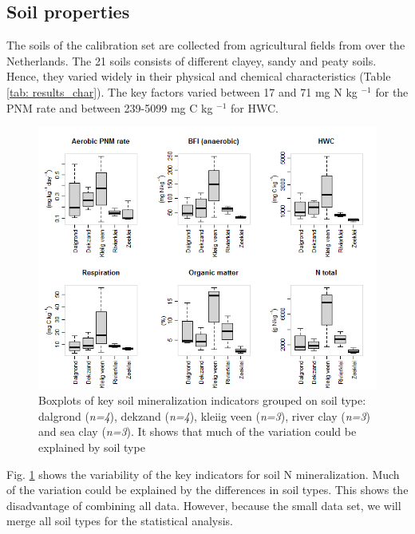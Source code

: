 \documentclass[10pt,twoside,dutch,english]{report}
\begin{document}
\subsection{Soil properties}
The soils of the calibration set are collected from agricultural fields from over the Netherlands. The 21 soils consists of different clayey, sandy and peaty soils. Hence, they varied widely in their physical and chemical characteristics (Table \ref{tab: results_char}). The key factors varied between 17 and 71 mg N kg $^{-1}$ for the PNM rate and between 239-5099 mg C kg $^{-1}$ for HWC. 









 
  


	\begin{figure}[ht] %
		
		\centering
		\includegraphics[width=1\linewidth]{results_boxplots}
		\caption{Boxplots of key soil mineralization indicators grouped on soil type: dalgrond (\textit{n=4}), dekzand (\textit{n=4}), kleiig veen (\textit{n=3}), river clay (\textit{n=3}) and sea clay (\textit{n=3}). It shows  that much of the variation could be explained by soil type}
		\label{fig:results_boxplots}
	\end{figure}
Fig. \ref{fig:results_boxplots} shows the variability of the key indicators for soil N mineralization. Much of the variation could be explained by the differences in soil types. This shows the disadvantage of combining all data. However, because the small data set, we will merge all soil types for the statistical analysis.
\end{document}
